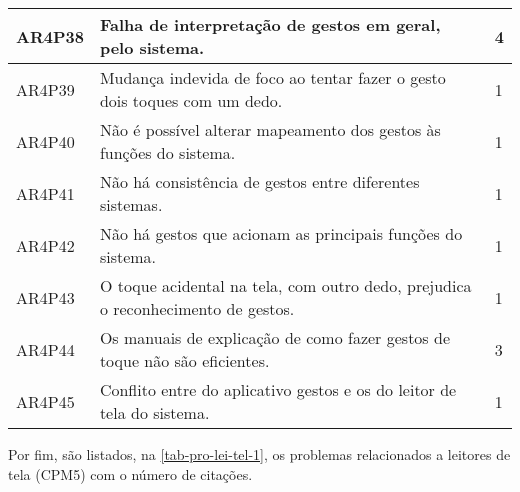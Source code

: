 \begin{table}[htb]
\begin{center}
\begin{tabular}{p{1.2cm}|p{12.0cm}|p{1.2cm}}
      \hline
      AR4P38          & Falha de interpretação de gestos em geral, pelo sistema.                            & 4                 \\
      \hline
      AR4P39          & Mudança indevida de foco ao tentar fazer o gesto dois toques com um dedo.           & 1                 \\
      \hline
      AR4P40          & Não é possível alterar mapeamento dos gestos às funções do sistema.                 & 1                 \\
      \hline
      AR4P41          & Não há consistência de gestos entre diferentes sistemas.                            & 1                 \\
      \hline
      AR4P42          & Não há gestos que acionam as principais funções do sistema.                         & 1                 \\
      \hline
      AR4P43          & O toque acidental na tela, com outro dedo, prejudica o reconhecimento de gestos.    & 1                 \\
      \hline
      AR4P44          & Os manuais de explicação de como fazer gestos de toque não são eficientes.          & 3                 \\
      \hline
      AR4P45          & Conflito entre do aplicativo gestos e os do leitor de tela do sistema.              & 1                 \\
    \end{tabular}
  \end{center}
\end{table}

\newpage

Por fim, são listados, na \autoref{tab-pro-lei-tel-1}, os problemas relacionados a leitores de tela (CPM5) com o número de citações.

